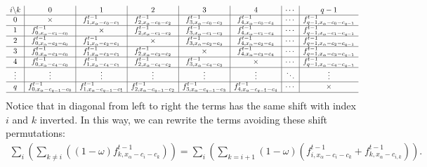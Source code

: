 \documentclass[letterpaper,10pt,english,openany,oneside]{jupyterBook}
\begin{document}
\begin{equation}\label{equation:Refs/LBM-Study/FDM-Belloti/General-FDM-Single-Relaxation:perm-symmetry-table-0}
\begin{split}
\begin{array}{c|c|c|c|c|c|c|c}
i \backslash k & 0 & 1 & 2 & 3 & 4 & \cdots & q-1 \\
\hline
0
& \times
& f_{1,x_{\alpha}-c_{0}-c_{1}}^{t-1}
& f_{2,x_{\alpha}-c_{0}-c_{2}}^{t-1}
& f_{3,x_{\alpha}-c_{0}-c_{3}}^{t-1}
& f_{4,x_{\alpha}-c_{0}-c_{4}}^{t-1}
& \cdots
& f_{q-1,x_{\alpha}-c_{0}-c_{q-1}}^{t-1} \\
\hline
1
& f_{0,x_{\alpha}-c_{1}-c_{0}}^{t-1}
& \times
& f_{2,x_{\alpha}-c_{1}-c_{2}}^{t-1}
& f_{3,x_{\alpha}-c_{1}-c_{3}}^{t-1}
& f_{4,x_{\alpha}-c_{1}-c_{4}}^{t-1}
& \cdots
& f_{q-1,x_{\alpha}-c_{1}-c_{q-1}}^{t-1} \\
\hline
2
& f_{0,x_{\alpha}-c_{2}-c_{0}}^{t-1}
& f_{1,x_{\alpha}-c_{2}-c_{1}}^{t-1}
& \times
& f_{3,x_{\alpha}-c_{2}-c_{3}}^{t-1}
& f_{4,x_{\alpha}-c_{2}-c_{4}}^{t-1}
& \cdots
& f_{q-1,x_{\alpha}-c_{2}-c_{q-1}}^{t-1} \\
\hline
3
& f_{0,x_{\alpha}-c_{3}-c_{0}}^{t-1}
& f_{1,x_{\alpha}-c_{3}-c_{1}}^{t-1}
& f_{2,x_{\alpha}-c_{3}-c_{2}}^{t-1}
& \times
& f_{4,x_{\alpha}-c_{3}-c_{4}}^{t-1}
& \cdots
& f_{q-1,x_{\alpha}-c_{3}-c_{q-1}}^{t-1} \\
\hline
4
& f_{0,x_{\alpha}-c_{4}-c_{0}}^{t-1}
& f_{1,x_{\alpha}-c_{4}-c_{1}}^{t-1}
& f_{2,x_{\alpha}-c_{4}-c_{2}}^{t-1}
& f_{3,x_{\alpha}-c_{4}-c_{3}}^{t-1}
& \times
& \cdots
& f_{q-1,x_{\alpha}-c_{4}-c_{q-1}}^{t-1} \\
\hline
\vdots
& \vdots
& \vdots
& \vdots
& \vdots
& \vdots
& \ddots
& \vdots \\
\hline
q
& f_{0,x_{\alpha}-c_{q-1}-c_{0}}^{t-1}
& f_{1,x_{\alpha}-c_{q-1}-c_{1}}^{t-1}
& f_{2,x_{\alpha}-c_{q-1}-c_{2}}^{t-1}
& f_{3,x_{\alpha}-c_{q-1}-c_{3}}^{t-1}
& f_{4,x_{\alpha}-c_{q-1}-c_{4}}^{t-1}
& \cdots
& \times \\
\hline
\end{array}
\end{split}
\end{equation}
\sphinxAtStartPar
Notice that in diagonal from left to right the terms has the same shift with index \(i\) and \(k\) inverted. In this way, we can rewrite the terms avoiding these shift permutations:
\begin{equation*}
\begin{split}
\displaystyle\sum_{i}\left( \sum_{k\neq i} \left( (1-\omega)f_{k,x_{\alpha}-c_{i}-c_{k}}^{t-1}  \right) \right)= \displaystyle\sum_{i}\left( \sum_{k= i+1} (1-\omega) \left( f_{i,x_{\alpha}-c_{i}-c_{k}}^{t-1} + f_{k,x_{\alpha}-c_{i,k}}^{t-1} \right) \right).
\end{split}
\end{equation*}
\end{document}
